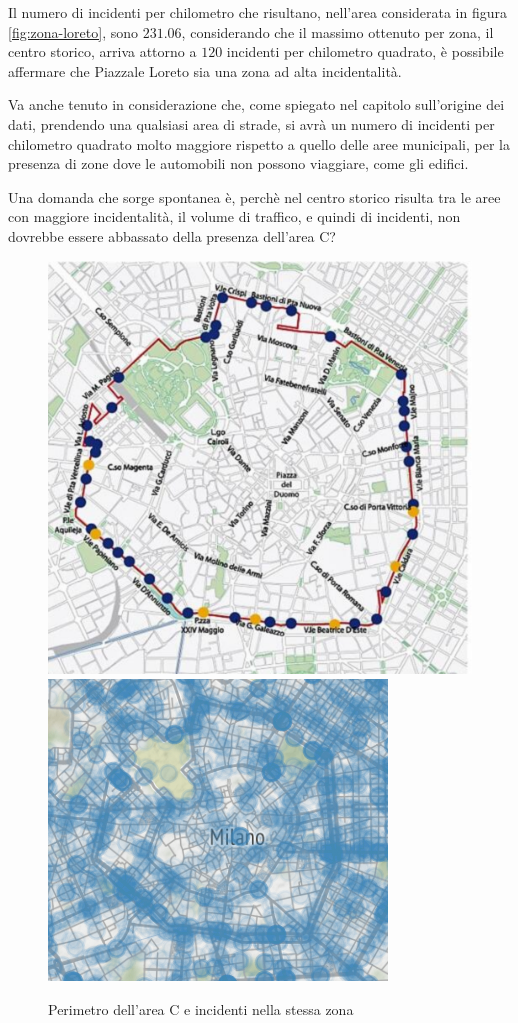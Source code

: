 \documentclass[a4paper,12pt]{report}
\begin{document}
Il numero di incidenti per chilometro che risultano, nell'area considerata in figura 
\ref{fig:zona-loreto}, sono $231.06$, considerando che il massimo ottenuto per zona, 
il centro storico, arriva attorno a $120$ incidenti per chilometro quadrato, è possibile affermare 
che Piazzale Loreto sia una zona ad alta incidentalità.

Va anche tenuto in considerazione che, come spiegato nel capitolo sull'origine dei dati, 
prendendo una qualsiasi area di strade, si avrà un numero di incidenti per chilometro quadrato 
molto maggiore rispetto a quello delle aree municipali, per la presenza di zone dove  
le automobili non possono viaggiare, come gli edifici.

Una domanda che sorge spontanea è, perchè nel centro storico risulta tra le aree con maggiore 
incidentalità, il volume di traffico, e quindi di incidenti, non dovrebbe essere abbassato 
della presenza dell'area C?

\begin{figure}
    \includegraphics[width=0.48\linewidth]{img/perimetro_area_c.png}
    \includegraphics[width=0.52\linewidth]{../src/area_c/area_c_incidenti.png}
    \caption{Perimetro dell'area C e incidenti nella stessa zona}
    \label{fig:perimetro-area-c}
\end{figure}
\end{document}
